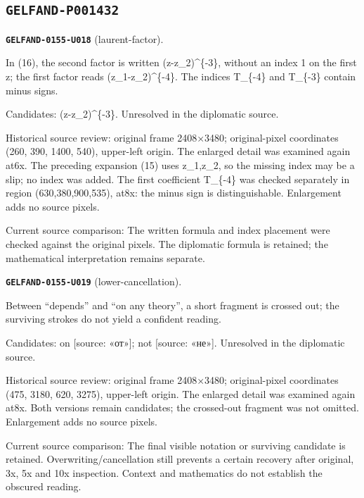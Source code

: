\subsection*{\texttt{GELFAND-P001432}}
\par\noindent\leavevmode{}\label{GELFAND-0155-U018}\label{GELFAND-P001432:laurent-factor}\textbf{\texttt{GELFAND-0155-U018}} (laurent-factor).\nopagebreak[4]\par
In (16), the second factor is written (z-z\_2)\textasciicircum{}\{-3\}, without an index 1 on the first z; the first factor reads (z\_1-z\_2)\textasciicircum{}\{-4\}. The indices T\_\{-4\} and T\_\{-3\} contain minus signs.\par
Candidates: (z-z\_2)\textasciicircum{}\{-3\}. Unresolved in the diplomatic source.\par
Historical source review: original frame 2408×3480; original-pixel coordinates (260, 390, 1400, 540), upper-left origin. The enlarged detail was examined again at6x. The preceding expansion (15) uses z\_1,z\_2, so the missing index may be a slip; no index was added. The first coefficient T\_\{-4\} was checked separately in region (630,380,900,535), at8x: the minus sign is distinguishable. Enlargement adds no source pixels.\par
Current source comparison: The written formula and index placement were checked against the original pixels. The diplomatic formula is retained; the mathematical interpretation remains separate.\par
\medskip
\par\noindent\leavevmode{}\label{GELFAND-0155-U019}\label{GELFAND-P001432:lower-cancellation}\textbf{\texttt{GELFAND-0155-U019}} (lower-cancellation).\nopagebreak[4]\par
Between “depends” and “on any theory”, a short fragment is crossed out; the surviving strokes do not yield a confident reading.\par
Candidates: on [source: «от»]; not [source: «не»]. Unresolved in the diplomatic source.\par
Historical source review: original frame 2408×3480; original-pixel coordinates (475, 3180, 620, 3275), upper-left origin. The enlarged detail was examined again at8x. Both versions remain candidates; the crossed-out fragment was not omitted. Enlargement adds no source pixels.\par
Current source comparison: The final visible notation or surviving candidate is retained. Overwriting/cancellation still prevents a certain recovery after original, 3x, 5x and 10x inspection. Context and mathematics do not establish the obscured reading.\par
\medskip
